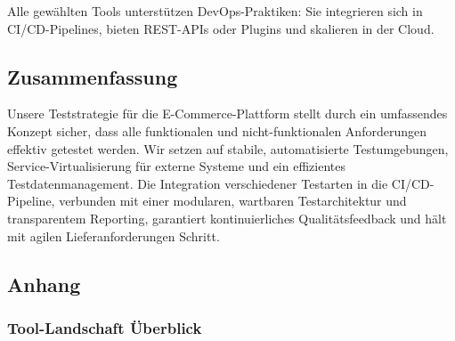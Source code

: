 Alle gewählten Tools unterstützen DevOps-Praktiken: Sie integrieren sich in CI/CD-Pipelines,
bieten REST-APIs oder Plugins und skalieren in der Cloud.

\subsection{Zusammenfassung}
Unsere Teststrategie für die E-Commerce-Plattform stellt durch ein umfassendes Konzept sicher,
dass alle funktionalen und nicht-funktionalen Anforderungen effektiv getestet werden.
Wir setzen auf stabile, automatisierte Testumgebungen, Service-Virtualisierung für externe Systeme
und ein effizientes Testdatenmanagement. Die Integration verschiedener Testarten in die
CI/CD-Pipeline, verbunden mit einer modularen, wartbaren Testarchitektur und transparentem
Reporting, garantiert kontinuierliches Qualitätsfeedback und hält mit agilen Lieferanforderungen
Schritt.

\newpage
\subsection{Anhang}
\subsubsection{Tool-Landschaft Überblick}

